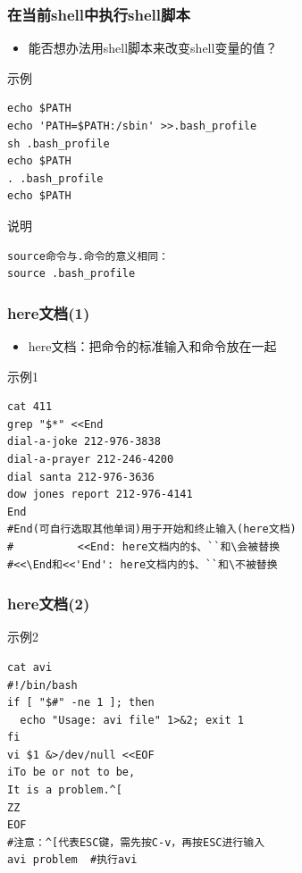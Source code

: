 \documentclass[xcolor=svgnames,presentation]{beamer}
\begin{document}
\begin{frame}[fragile]
\frametitle{在当前shell中执行shell脚本}
\label{sec-1-1-13}
\begin{itemize}

\item 能否想办法用shell脚本来改变shell变量的值？
\label{sec-1-1-13-1}%
\end{itemize} %
\begin{exampleblock}{示例}
\label{sec-1-1-13-2}


\begin{verbatim}
echo $PATH
echo 'PATH=$PATH:/sbin' >>.bash_profile
sh .bash_profile
echo $PATH
. .bash_profile
echo $PATH
\end{verbatim}
\end{exampleblock}
\begin{block}{说明}
\label{sec-1-1-13-3}


\begin{verbatim}
source命令与.命令的意义相同：
source .bash_profile
\end{verbatim}
\end{block}
\end{frame}
\begin{frame}[fragile]
\frametitle{here文档(1)}
\label{sec-1-1-14}
\begin{itemize}

\item here文档：把命令的标准输入和命令放在一起
\label{sec-1-1-14-1}%
\end{itemize} %
\begin{exampleblock}{示例1}
\label{sec-1-1-14-2}


\begin{verbatim}
cat 411
grep "$*" <<End
dial-a-joke 212-976-3838
dial-a-prayer 212-246-4200
dial santa 212-976-3636
dow jones report 212-976-4141
End
#End(可自行选取其他单词)用于开始和终止输入(here文档)
#          <<End: here文档内的$、``和\会被替换
#<<\End和<<'End': here文档内的$、``和\不被替换
\end{verbatim}
\end{exampleblock}
\end{frame}
\begin{frame}[fragile]
\frametitle{here文档(2)}
\label{sec-1-1-15}
\begin{exampleblock}{示例2}
\label{sec-1-1-15-1}


\begin{verbatim}
cat avi
#!/bin/bash
if [ "$#" -ne 1 ]; then
  echo "Usage: avi file" 1>&2; exit 1
fi
vi $1 &>/dev/null <<EOF
iTo be or not to be,
It is a problem.^[
ZZ
EOF
#注意：^[代表ESC键，需先按C-v，再按ESC进行输入
avi problem  #执行avi
\end{verbatim}
\end{exampleblock}
\end{frame}
\end{document}
